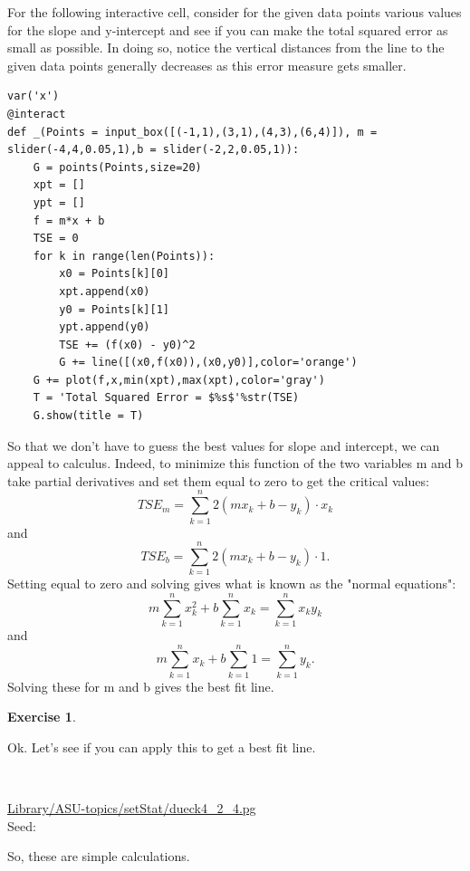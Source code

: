 \documentclass[10pt,]{book}
\theoremstyle{plain}
\theoremstyle{definition}
\theoremstyle{definition}
\theoremstyle{definition}
\newtheorem{exercise}[theorem]{Exercise}
\numberwithin{equation}{section}
\begin{document}
For the following interactive cell, consider for the given data points various values for the slope and y-intercept and see if you can make the total squared error as small as possible. In doing so, notice the vertical distances from the line to the given data points generally decreases as this error measure gets smaller. 
%
\begin{lstlisting}[style=sageinput]
var('x')
@interact
def _(Points = input_box([(-1,1),(3,1),(4,3),(6,4)]), m = slider(-4,4,0.05,1),b = slider(-2,2,0.05,1)):   
    G = points(Points,size=20)
    xpt = []
    ypt = []
    f = m*x + b
    TSE = 0
    for k in range(len(Points)):
        x0 = Points[k][0]
        xpt.append(x0)
        y0 = Points[k][1]
        ypt.append(y0)
        TSE += (f(x0) - y0)^2
        G += line([(x0,f(x0)),(x0,y0)],color='orange')
    G += plot(f,x,min(xpt),max(xpt),color='gray')
    T = 'Total Squared Error = $%s$'%str(TSE)
    G.show(title = T)
\end{lstlisting}
\par

So that we don't have to guess the best values for slope and intercept, we can appeal to calculus. Indeed, to minimize this function of the two variables m and b take partial derivatives and set them equal to zero to get the critical values:
\begin{equation*}TSE_m = \sum_{k=1}^n 2(m x_k + b - y_k) \cdot x_k\end{equation*}
and
\begin{equation*}TSE_b = \sum_{k=1}^n 2(m x_k + b - y_k) \cdot 1 .\end{equation*}
Setting equal to zero and solving gives what is known as the "normal equations":
\begin{equation*}m \sum_{k=1}^n x_k^2 + b \sum_{k=1}^n x_k = \sum_{k=1}^n x_k y_k\end{equation*}
and
\begin{equation*}m \sum_{k=1}^n x_k + b \sum_{k=1}^n 1 = \sum_{k=1}^n y_k.\end{equation*}
Solving these for m and b gives the best fit line.
%
\begin{exercise}\label{exercise-6}

		Ok.  Let's see if you can apply this to get a best fit line.
\par\medskip
\mbox{}\\ %
\begin{mdframed}
{}\par\vspace*{2ex}%
{\tiny\ttfamily\noindent\url{Library/ASU-topics/setStat/dueck4_2_4.pg}\\Seed: \hfill}\end{mdframed}
\medskip\noindent 
		So, these are simple calculations.
\par
\end{exercise}
\typeout{************************************************}
\typeout{************************************************}
\end{document}
